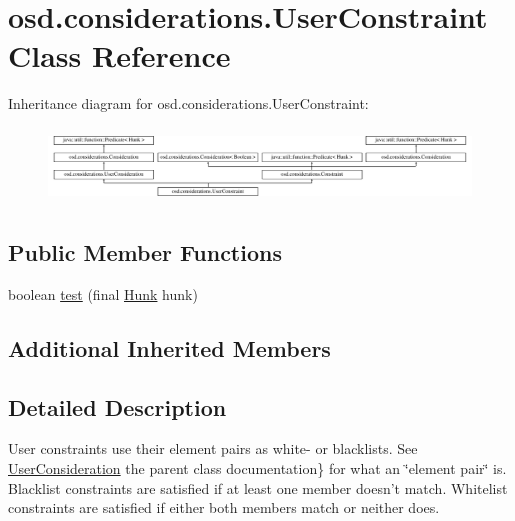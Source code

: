\hypertarget{classosd_1_1considerations_1_1_user_constraint}{\section{osd.\-considerations.\-User\-Constraint Class Reference}
\label{classosd_1_1considerations_1_1_user_constraint}
}
Inheritance diagram for osd.\-considerations.\-User\-Constraint\-:\begin{figure}[H]
\begin{center}
\leavevmode
\includegraphics[height=2.014389cm]{classosd_1_1considerations_1_1_user_constraint}
\end{center}
\end{figure}
\subsection*{Public Member Functions}
\begin{DoxyCompactItemize}
\item 
boolean \hyperlink{classosd_1_1considerations_1_1_user_constraint_a9378d413848106a42ede0782730c0408}{test} (final \hyperlink{classosd_1_1output_1_1_hunk}{Hunk} hunk)
\end{DoxyCompactItemize}
\subsection*{Additional Inherited Members}


\subsection{Detailed Description}
User constraints use their element pairs as white-\/ or blacklists. See  \hyperlink{classosd_1_1considerations_1_1_user_consideration}{User\-Consideration} the parent class documentation\} for what an \char`\"{}element pair\char`\"{} is. Blacklist constraints are satisfied if at least one member doesn't match. Whitelist constraints are satisfied if either both members match or neither does. 

